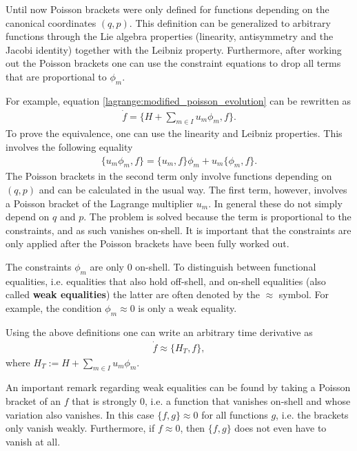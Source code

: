     \begin{method}
        Until now Poisson brackets were only defined for functions depending on the canonical coordinates $(q,p)$. This definition can be generalized to arbitrary functions through the Lie algebra properties (linearity, antisymmetry and the Jacobi identity) together with the Leibniz property. Furthermore, after working out the Poisson brackets one can use the constraint equations to drop all terms that are proportional to $\phi_m$.

        For example, equation \ref{lagrange:modified_poisson_evolution} can be rewritten as
        \begin{gather}
            \dot{f} = \{H + \sum_{m\in I}u_m\phi_m, f\}.
        \end{gather}
        To prove the equivalence, one can use the linearity and Leibniz properties. This involves the following equality
        \begin{gather}
            \{u_m\phi_m, f\} = \{u_m,f\}\phi_m + u_m\{\phi_m,f\}.
        \end{gather}
        The Poisson brackets in the second term only involve functions depending on $(q,p)$ and can be calculated in the usual way. The first term, however, involves a Poisson bracket of the Lagrange multiplier $u_m$. In general these do not simply depend on $q$ and $p$. The problem is solved because the term is proportional to the constraints, and as such vanishes on-shell. It is important that the constraints are only applied after the Poisson brackets have been fully worked out.
    \end{method}

    \begin{notation}
        The constraints $\phi_m$ are only 0 on-shell. To distinguish between functional equalities, i.e. equalities that also hold off-shell, and on-shell equalities (also called \textbf{weak equalities}) the latter are often denoted by the $\approx$ symbol. For example, the condition $\phi_m\approx0$ is only a weak equality.
    \end{notation}
    Using the above definitions one can write an arbitrary time derivative as
    \begin{gather}
        \dot{f} \approx \{H_T,f\},
    \end{gather}
    where $H_T := H + \sum_{m\in I}u_m\phi_m$.

    \begin{remark}
        An important remark regarding weak equalities can be found by taking a Poisson bracket of an $f$ that is strongly 0, i.e. a function that vanishes on-shell and whose variation also vanishes. In this case $\{f,g\}\approx0$ for all functions $g$, i.e. the brackets only vanish weakly. Furthermore, if $f\approx0$, then $\{f,g\}$ does not even have to vanish at all.
    \end{remark}

